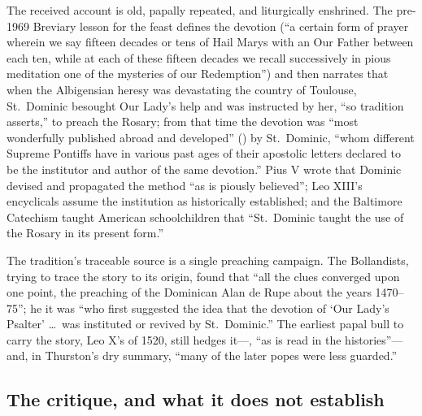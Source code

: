 The received account is old, papally repeated, and liturgically
enshrined. The pre-1969 Breviary lesson for the feast defines the
devotion (``a certain form of prayer wherein we say fifteen decades or
tens of Hail Marys with an Our Father between each ten, while at each of
these fifteen decades we recall successively in pious meditation one of
the mysteries of our Redemption'') and then narrates that when the
Albigensian heresy was devastating the country of Toulouse, St.~Dominic
besought Our Lady's help and was instructed by her, ``so tradition
asserts,'' to preach the Rosary; from that time the devotion was ``most
wonderfully published abroad and developed'' () by St.~Dominic, ``whom different Supreme Pontiffs
have in various past ages of their apostolic letters declared to be the
institutor and author of the same devotion.'' Pius V wrote that Dominic
devised and propagated the method ``as is piously believed''; Leo XIII's
encyclicals assume the institution as historically established; and the
Baltimore Catechism taught American schoolchildren that ``St.~Dominic
taught the use of the Rosary in its present form.''

The tradition's traceable source is a single preaching campaign. The
Bollandists, trying to trace the story to its origin, found that ``all
the clues converged upon one point, the preaching of the Dominican Alan
de Rupe about the years 1470--75''; he it was ``who first suggested the
idea that the devotion of `Our Lady's Psalter' \ldots\ was instituted or
revived by St.~Dominic.'' The earliest papal bull to carry the story,
Leo X's  of 1520, still hedges it---, ``as is read in the histories''---and, in
Thurston's dry summary, ``many of the later popes were less
guarded.''

\subsection{The critique, and what it does not establish}

